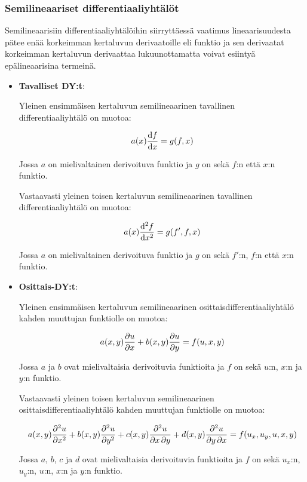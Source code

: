\documentclass[../johdoksia.tex]{subfiles}
\begin{document}
	\subsubsection{Semilineaariset differentiaaliyhtälöt}
	
	Semilineaarisiin differentiaaliyhtälöihin siirryttäessä vaatimus lineaarisuudesta pätee enää korkeimman kertaluvun derivaatoille eli funktio ja sen derivaatat korkeimman kertaluvun derivaattaa lukuunottamatta voivat esiintyä epälineaarisina termeinä.
	
	\begin{itemize}
		\item \textbf{Tavalliset DY:t}:
		
		Yleinen ensimmäisen kertaluvun semilineaarinen tavallinen differentiaaliyhtälö on muotoa:
		
		\begin{equation}
			a(x)\odv{f}{x} = g(f, x)
		\end{equation}
		
		Jossa $a$ on mielivaltainen derivoituva funktio ja $g$ on sekä $f$:n että $x$:n funktio.
		
		Vastaavasti yleinen toisen kertaluvun semilineaarinen tavallinen differentiaaliyhtälö on muotoa:
		
		\begin{equation}
			a(x)\odv{^2f}{x^2} =  g(f', f, x)
		\end{equation}
		
		Jossa $a$ on mielivaltainen derivoituva funktio ja $g$ on sekä $f'$:n, $f$:n että $x$:n funktio.
		
		\item \textbf{Osittais-DY:t}:
		
		Yleinen ensimmäisen kertaluvun semilineaarinen osittaisdifferentiaaliyhtälö kahden muuttujan funktiolle on muotoa:
		
		\begin{equation}
			a(x, y)\pdv{u}{x} + b(x, y)\pdv{u}{y} = f(u, x, y)
		\end{equation}
		
		Jossa $a$ ja $b$ ovat mielivaltaisia derivoituvia funktioita ja $f$ on sekä $u$:n, $x$:n ja $y$:n funktio.
		
		Vastaavasti yleinen toisen kertaluvun semilineaarinen osittaisdifferentiaaliyhtälö kahden muuttujan funktiolle on muotoa:
		
		\begin{equation}
			a(x,y)\pdv[order = 2]{u}{x} + b(x,y)\pdv[order = 2]{u}{y} + c(x, y)\pdv{u}{x,y} + d(x, y)\pdv{u}{y,x} = f(u_x, u_y, u, x, y)
		\end{equation}
		
		Jossa $a$, $b$, $c$ ja $d$ ovat mielivaltaisia derivoituvia funktioita ja $f$ on sekä $u_x$:n, $u_y$:n, $u$:n, $x$:n ja $y$:n funktio.
	\end{itemize}
	
\end{document}
